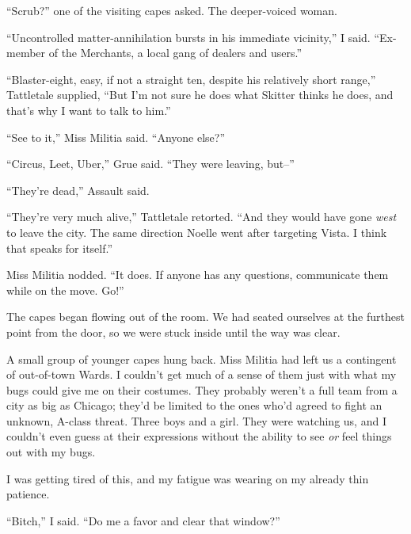 ``Scrub?'' one of the visiting capes asked.  The deeper-voiced woman.



``Uncontrolled matter-annihilation bursts in his immediate vicinity,'' I said.  ``Ex-member of the Merchants, a local gang of dealers and users.''



``Blaster-eight, easy, if not a straight ten, despite his relatively short range,'' Tattletale supplied, ``But I'm not sure he does what Skitter thinks he does, and that's why I want to talk to him.''



``See to it,'' Miss Militia said.  ``Anyone else?''



``Circus, Leet, Uber,'' Grue said.  ``They were leaving, but--''



``They're dead,'' Assault said.



``They're very much alive,'' Tattletale retorted.  ``And they would have gone \emph{west} to leave the city.  The same direction Noelle went after targeting Vista.  I think that speaks for itself.''



Miss Militia nodded.  ``It does.  If anyone has any questions, communicate them while on the move.  Go!''



The capes began flowing out of the room.  We had seated ourselves at the furthest point from the door, so we were stuck inside until the way was clear.



A small group of younger capes hung back.  Miss Militia had left us a contingent of out-of-town Wards.  I couldn't get much of a sense of them just with what my bugs could give me on their costumes.  They probably weren't a full team from a city as big as Chicago; they'd be limited to the ones who'd agreed to fight an unknown, A-class threat.  Three boys and a girl.  They were watching us, and I couldn't even guess at their expressions without the ability to see \emph{or }feel things out with my bugs.



I was getting tired of this, and my fatigue was wearing on my already thin patience.



``Bitch,'' I said.  ``Do me a favor and clear that window?''



